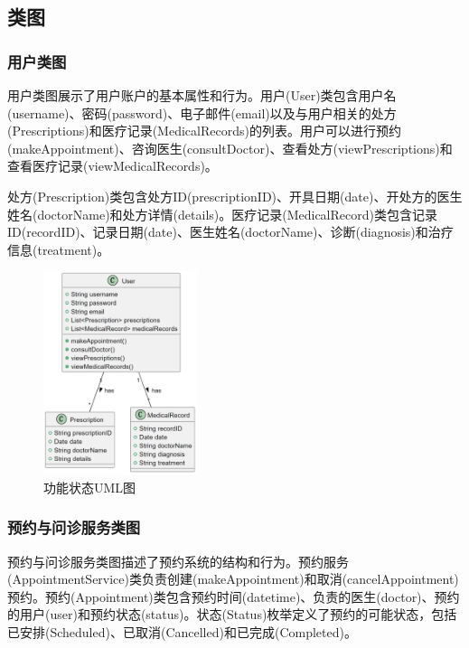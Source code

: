 \subsection{类图}
\subsubsection{用户类图}
用户类图展示了用户账户的基本属性和行为。用户(User)类包含用户名(username)、密码(password)、电子邮件(email)以及与用户相关的处方(Prescriptions)和医疗记录(MedicalRecords)的列表。用户可以进行预约(makeAppointment)、咨询医生(consultDoctor)、查看处方(viewPrescriptions)和查看医疗记录(viewMedicalRecords)。

处方(Prescription)类包含处方ID(prescriptionID)、开具日期(date)、开处方的医生姓名(doctorName)和处方详情(details)。医疗记录(MedicalRecord)类包含记录ID(recordID)、记录日期(date)、医生姓名(doctorName)、诊断(diagnosis)和治疗信息(treatment)。
\begin{figure}[htbp]
	\centering
	\includegraphics[width=0.4\textwidth]{figures/04.png}
	\caption{功能状态UML图}
	\label{fig:functional_state_diagram}
\end{figure}

\subsubsection{预约与问诊服务类图}
预约与问诊服务类图描述了预约系统的结构和行为。预约服务(AppointmentService)类负责创建(makeAppointment)和取消(cancelAppointment)预约。预约(Appointment)类包含预约时间(datetime)、负责的医生(doctor)、预约的用户(user)和预约状态(status)。状态(Status)枚举定义了预约的可能状态，包括已安排(Scheduled)、已取消(Cancelled)和已完成(Completed)。

